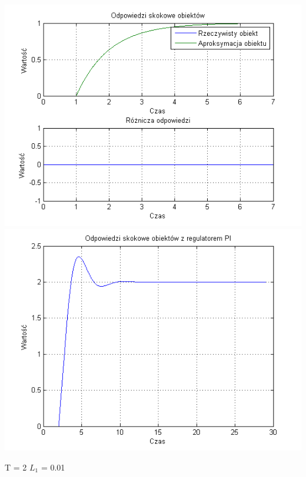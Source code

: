 \documentclass[10pt,a4paper]{article}
\begin{document}
\begin{center}
\includegraphics[scale=1]{images/jeden/skrypt_169.png}\\
\includegraphics[scale=1]{images/jeden/skrypt_170.png}\\
\end{center}
\newpage
T = 2
$L_1$ = 0.01
\end{document}
